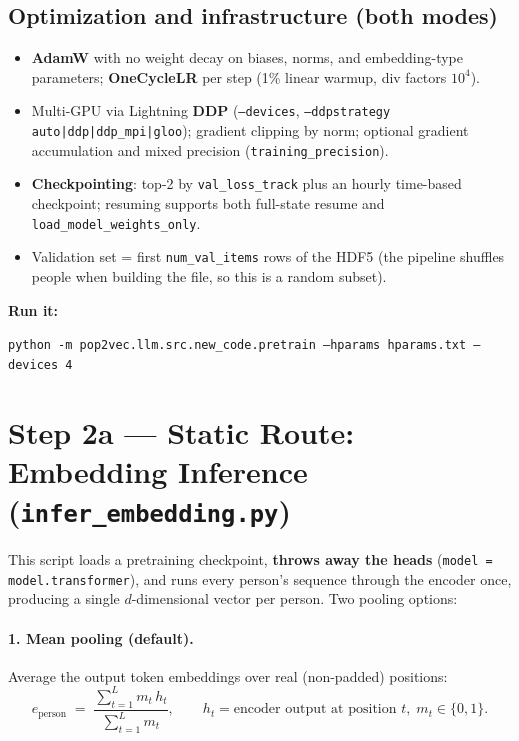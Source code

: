 \documentclass[11pt,a4paper]{article}
\newcommand{\file}[1]{\texttt{\small #1}}
\newcommand{\code}[1]{\texttt{\small #1}}
\begin{document}
\subsection{Optimization and infrastructure (both modes)}
\begin{itemize}[nosep]
  \item \textbf{AdamW} with no weight decay on biases, norms, and
        embedding-type parameters; \textbf{OneCycleLR} per step
        (1\% linear warmup, div factors $10^4$).
  \item Multi-GPU via Lightning \textbf{DDP} (\code{--devices},
        \code{--ddpstrategy auto|ddp|ddp\_mpi|gloo}); gradient clipping by norm;
        optional gradient accumulation and mixed precision
        (\code{training\_precision}).
  \item \textbf{Checkpointing}: top-2 by \code{val\_loss\_track} plus an hourly
        time-based checkpoint; resuming supports both full-state resume and
        \code{load\_model\_weights\_only}.
  \item Validation set = first \code{num\_val\_items} rows of the HDF5 (the
        pipeline shuffles people when building the file, so this is a random
        subset).
\end{itemize}

\noindent\textbf{Run it:}
\begin{center}
\code{python -m pop2vec.llm.src.new\_code.pretrain --hparams hparams.txt --devices 4}
\end{center}

\section{Step 2a --- Static Route: Embedding Inference
(\file{infer\_embedding.py})}\label{sec:infer}

This script loads a pretraining checkpoint, \textbf{throws away the heads}
(\code{model = model.transformer}), and runs every person's sequence through the
encoder once, producing a single $d$-dimensional vector per person. Two pooling
options:

\paragraph{1. Mean pooling (default).} Average the output token embeddings over
real (non-padded) positions:
\[
e_{\text{person}} \;=\; \frac{\sum_{t=1}^{L} m_t \, h_t}{\sum_{t=1}^{L} m_t},
\qquad h_t = \text{encoder output at position } t,\; m_t \in \{0,1\}.
\]
\end{document}
